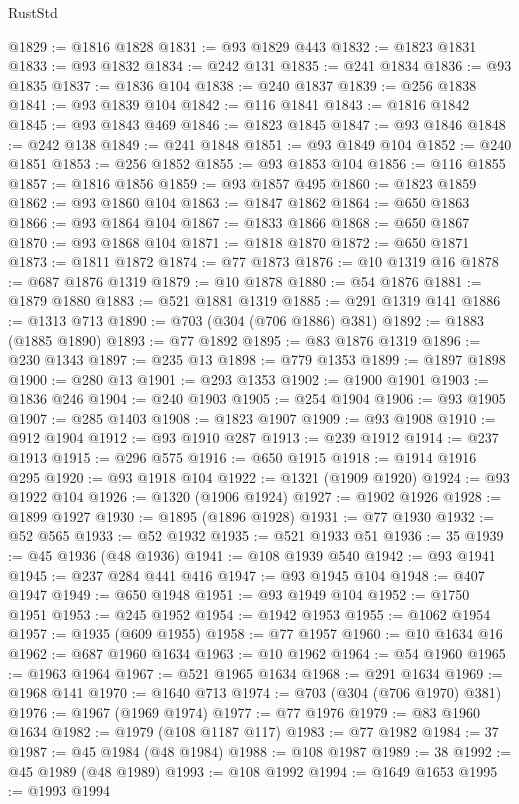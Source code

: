 \begin{lexlean}{RustStd}
\begin{coremodule}
@1829 := @1816 @1828
@1831 := @93 @1829 @443
@1832 := @1823 @1831
@1833 := @93 @1832
@1834 := @242 @131
@1835 := @241 @1834
@1836 := @93 @1835
@1837 := @1836 @104
@1838 := @240 @1837
@1839 := @256 @1838
@1841 := @93 @1839 @104
@1842 := @116 @1841
@1843 := @1816 @1842
@1845 := @93 @1843 @469
@1846 := @1823 @1845
@1847 := @93 @1846
@1848 := @242 @138
@1849 := @241 @1848
@1851 := @93 @1849 @104
@1852 := @240 @1851
@1853 := @256 @1852
@1855 := @93 @1853 @104
@1856 := @116 @1855
@1857 := @1816 @1856
@1859 := @93 @1857 @495
@1860 := @1823 @1859
@1862 := @93 @1860 @104
@1863 := @1847 @1862
@1864 := @650 @1863
@1866 := @93 @1864 @104
@1867 := @1833 @1866
@1868 := @650 @1867
@1870 := @93 @1868 @104
@1871 := @1818 @1870
@1872 := @650 @1871
@1873 := @1811 @1872
@1874 := @77 @1873
@1876 := @10 @1319 @16
@1878 := @687 @1876 @1319
@1879 := @10 @1878
@1880 := @54 @1876
@1881 := @1879 @1880
@1883 := @521 @1881 @1319
@1885 := @291 @1319 @141
@1886 := @1313 @713
@1890 := @703 (@304 (@706 @1886) @381)
@1892 := @1883 (@1885 @1890)
@1893 := @77 @1892
@1895 := @83 @1876 @1319
@1896 := @230 @1343
@1897 := @235 @13
@1898 := @779 @1353
@1899 := @1897 @1898
@1900 := @280 @13
@1901 := @293 @1353
@1902 := @1900 @1901
@1903 := @1836 @246
@1904 := @240 @1903
@1905 := @254 @1904
@1906 := @93 @1905
@1907 := @285 @1403
@1908 := @1823 @1907
@1909 := @93 @1908
@1910 := @912 @1904
@1912 := @93 @1910 @287
@1913 := @239 @1912
@1914 := @237 @1913
@1915 := @296 @575
@1916 := @650 @1915
@1918 := @1914 @1916 @295
@1920 := @93 @1918 @104
@1922 := @1321 (@1909 @1920)
@1924 := @93 @1922 @104
@1926 := @1320 (@1906 @1924)
@1927 := @1902 @1926
@1928 := @1899 @1927
@1930 := @1895 (@1896 @1928)
@1931 := @77 @1930
@1932 := @52 @565
@1933 := @52 @1932
@1935 := @521 @1933 @51
@1936 := 35
@1939 := @45 @1936 (@48 @1936)
@1941 := @108 @1939 @540
@1942 := @93 @1941
@1945 := @237 @284 @441 @416
@1947 := @93 @1945 @104
@1948 := @407 @1947
@1949 := @650 @1948
@1951 := @93 @1949 @104
@1952 := @1750 @1951
@1953 := @245 @1952
@1954 := @1942 @1953
@1955 := @1062 @1954
@1957 := @1935 (@609 @1955)
@1958 := @77 @1957
@1960 := @10 @1634 @16
@1962 := @687 @1960 @1634
@1963 := @10 @1962
@1964 := @54 @1960
@1965 := @1963 @1964
@1967 := @521 @1965 @1634
@1968 := @291 @1634
@1969 := @1968 @141
@1970 := @1640 @713
@1974 := @703 (@304 (@706 @1970) @381)
@1976 := @1967 (@1969 @1974)
@1977 := @77 @1976
@1979 := @83 @1960 @1634
@1982 := @1979 (@108 @1187 @117)
@1983 := @77 @1982
@1984 := 37
@1987 := @45 @1984 (@48 @1984)
@1988 := @108 @1987
@1989 := 38
@1992 := @45 @1989 (@48 @1989)
@1993 := @108 @1992
@1994 := @1649 @1653
@1995 := @1993 @1994

\end{coremodule}
\end{lexlean}
